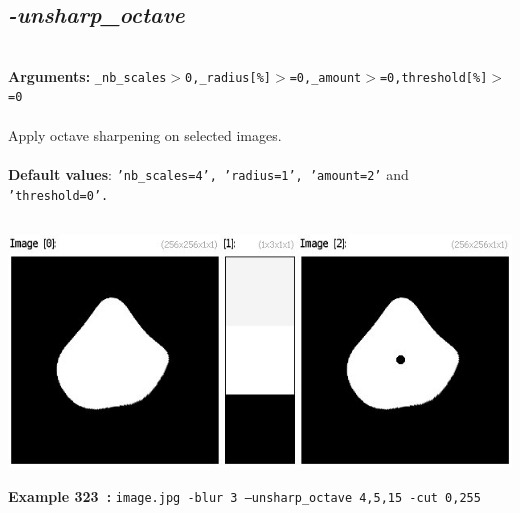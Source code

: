 \documentclass[a4paper,11pt,twoside]{book}
\begin{document}
\subsection{\emph{-unsharp\_octave} }\vspace*{-0.5em}
~\\\textbf{Arguments: } 
{\small \texttt{\_nb\_scales$>$0,\_radius[\%]$>$=0,\_amount$>$=0,threshold[\%]$>$=0}}\\~\\
Apply octave sharpening on selected images.
~\\~\\\textbf{Default values}: {\small \texttt{'nb\_scales=4', 'radius=1', 'amount=2'} and \texttt{'threshold=0'.}}
\begin{center}\includegraphics[keepaspectratio=true,height=7cm,width=\textwidth]{img/gmic_def323.jpg}\\
{\footnotesize \textbf{Example 323~:} \texttt{image.jpg -blur 3 --unsharp\_octave 4,5,15 -cut 0,255}}
\end{center}
\end{document}
